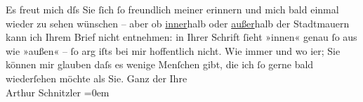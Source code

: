 \begin{ledgroupsized}[t]{13cm}
           Es freut mich dſs Sie ſich ſo freundlich meiner erinnern und mich bald einmal
                    wieder zu sehen wünschen – aber ob \uline{inner}halb
                    oder \uline{außer}halb der Stadtmauern kann ich Ihrem
                    Brief nicht entnehmen: in Ihrer Schrift ſieht {\pb}»innen«
                    genau ſo aus wie »außen« – ſo arg iſts bei mir hoffentlich nicht.\pend
           \pstart
           Wie immer und wo i{\geminationm}er; Sie können mir glauben daſs
                    es wenige Menſchen gibt, die ich ſo gerne bald wiederſehen möchte als Sie.\pend
           \pstart
           Ganz der Ihre{\\[\baselineskip]}Arthur Schnitzler\pend
           \leftskip=0em{}\endnumbering{}\end{ledgroupsized}  \newcommand{\dateiname}{L00964}\newcommand{\titel}{Arthur Schnitzler an Gerhart Hauptmann, 25. 8. 1899}\newcommand{\editorInnen}{ Martin Anton Müller und Gerd-Hermann Susen}
      